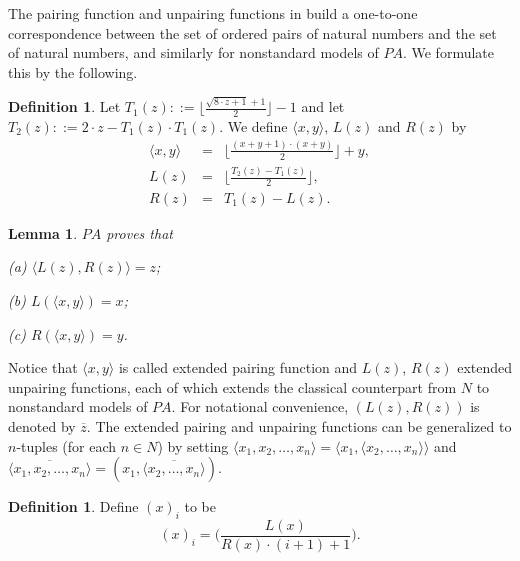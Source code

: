\documentclass[a4paper,11pt]{article}
\begin{document}
The pairing function and unpairing functions in \cite[p45]{computability_1} build a one-to-one correspondence between the set of ordered pairs of natural numbers and the set of natural numbers, and similarly for nonstandard models of $PA$. We formulate this by the following.

\theoremstyle{definition}
\newtheorem{extended_basic_properties_of_extended_pairing_functions}[basic_functions]{Definition}
\begin{extended_basic_properties_of_extended_pairing_functions}
  Let $T_1(z) ::= \Big\lfloor \frac{\sqrt{8\cdot z+1}+1}{2}\Big\rfloor -1$ and let $T_2(z) ::= 2\cdot z-T_1(z)\cdot T_1(z)$. We define $\langle x,y\rangle$, $L(z)$ and $R(z)$ by
  \begin{eqnarray*}
    \langle x,y\rangle &=& \Big\lfloor \frac{(x+y+1)\cdot (x+y)}{2} \Big\rfloor + y, \\
    L(z) &=& \Big\lfloor\frac{T_2(z)-T_1(z)}{2}\Big\rfloor, \\
    R(z) &=& T_1(z)-L(z).
  \end{eqnarray*}
\end{extended_basic_properties_of_extended_pairing_functions}

\theoremstyle{plain}
\newtheorem{basic_properties_of_extended_pairing_functions}[basic_functions]{Lemma}
\begin{basic_properties_of_extended_pairing_functions}\label{basic_properties_of_extended_pairing_functions}
$PA$ proves that

(a) $\langle L(z),R(z)\rangle=z$;

(b) $L(\langle x,y\rangle)=x$;

(c) $R(\langle x,y\rangle)=y$.
\end{basic_properties_of_extended_pairing_functions}
Notice that $\langle x, y\rangle$ is called extended pairing function and $L(z)$, $R(z)$ extended unpairing functions, each of which extends the classical counterpart from $N$ to nonstandard models of $PA$. For notational convenience, $(L(z),R(z))$ is denoted by $\overline{z}$. The extended pairing and unpairing functions can be generalized to $n$-tuples (for each $n\in N$) by setting $\langle x_1,x_2,\ldots,x_n\rangle = \langle x_1,\langle x_2,\ldots,x_n\rangle\rangle$ and $\overline{\langle x_1,x_2,\ldots,x_n\rangle} = (x_1,\overline{\langle x_2,\ldots,x_n\rangle})$.

\theoremstyle{definition}
\newtheorem{extended_beta_function}[basic_functions]{Definition}
\begin{extended_beta_function}\label{extended_beta_function}
Define $(x)_i$ to be
\begin{equation*}
(x)_i=\Big( \frac{L(x)}{R(x)\cdot (i+ 1 )+1} \Big).
\end{equation*}
\end{extended_beta_function}
\end{document}
